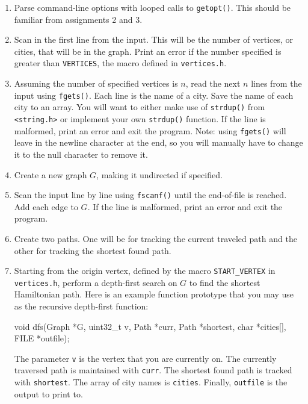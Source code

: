 \documentclass[11pt]{article}
\begin{document}
\begin{enumerate}
  \item Parse command-line options with looped calls to
    \texttt{getopt()}. This should be familiar from assignments 2 and 3.
  \item Scan in the first line from the input. This will be the
    number of vertices, or cities, that will be in the graph. Print an
    error if the number specified is greater than \texttt{VERTICES}, the
    macro defined in \texttt{vertices.h}.
  \item Assuming the number of specified vertices is $n$, read the next
    $n$ lines from the input using \texttt{fgets()}. Each line is the
    name of a city. Save the name of each city to an array. You will
    want to either make use of \texttt{strdup()} from
    \texttt{<string.h>} or implement your own \texttt{strdup()}
    function. If the line is malformed, print an error
    and exit the program. Note: using \texttt{fgets()} will leave in the
    newline character at the end, so you will manually have to change it
    to the null character to remove it.
  \item Create a new graph $G$, making it undirected if specified.
  \item Scan the input line by line using \texttt{fscanf()} until the
    end-of-file is reached.  Add each edge to $G$. If the line is
    malformed, print an error and exit the program.
  \item Create two paths. One will be for tracking the current traveled path and
    the other for tracking the shortest found path.
  \item Starting from the origin vertex, defined by the macro
    \texttt{START\_VERTEX} in \texttt{vertices.h}, perform a depth-first
    search on $G$ to find the shortest Hamiltonian path. Here is an
    example function prototype that you may use as the recursive
    depth-first function:

\begin{codelisting}{}
void dfs(Graph *G, uint32_t v, Path *curr, Path *shortest, char *cities[], FILE *outfile);
\end{codelisting}

    The parameter \texttt{v} is the vertex that you are currently on.
    The currently traversed path is maintained with \texttt{curr}. The
    shortest found path is tracked with \texttt{shortest}. The array of
    city names is \texttt{cities}. Finally, \texttt{outfile} is the
    output to print to.


\end{enumerate}
\end{document}

